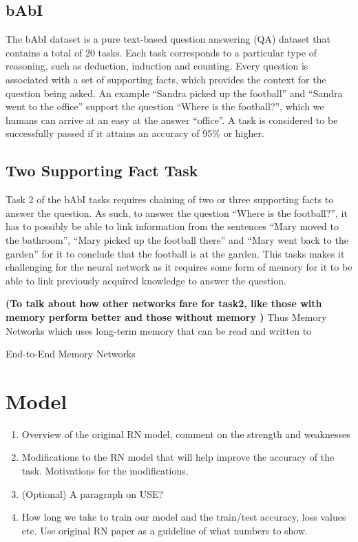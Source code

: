 \documentclass{article}
\begin{document}
\subsection{bAbI}
The bAbI dataset is a pure text-based question answering (QA) dataset that contains a total of 20 tasks. Each task corresponds to a particular type of reasoning, such as deduction, induction and counting. Every question is associated with a set of supporting facts, which provides the context for the question being asked. An example ``Sandra picked up the football'' and ``Sandra went to the office'' support the question ``Where is the football?'', which we humans can arrive at an easy at the answer ``office''. A task is considered to be successfully passed if it attains an accuracy of 95\% or higher.


\subsection{Two Supporting Fact Task}
Task 2 of the bAbI tasks requires chaining of two or three supporting facts to answer the question. As such, to answer the question ``Where is the football?'', it has to possibly be able to link information from the sentences ``Mary moved to the bathroom'', ``Mary picked up the football there'' and ``Mary went back to the garden'' for it to conclude that the football is at the garden. This tasks makes it challenging for the neural network as it requires some form of memory for it to be able to link previously acquired knowledge to answer the question. 

\textbf{(To talk about how other networks fare for task2, like those with memory perform better and those without memory )}
Thus Memory Networks \cite{Weston2015a} which uses long-term memory that can be read and written to

End-to-End Memory Networks \cite{Sukhbaatar2015}


\section{Model}
\begin{enumerate}
\item Overview of the original RN model, comment on the strength and weaknesses
\item Modifications to the RN model that will help improve the accuracy of the task. Motivations for the modifications.
\item (Optional) A paragraph on USE?

\item How long we take to train our model and the train/test accuracy, loss values etc. Use original RN paper as a guideline of what numbers to show.
\end{enumerate}
\end{document}
